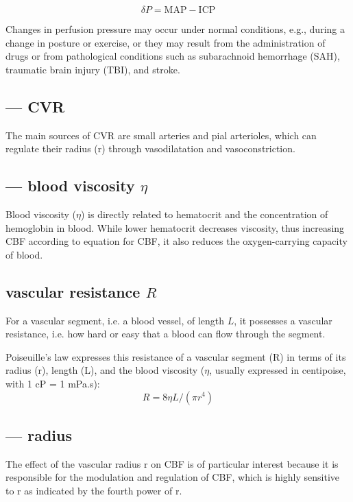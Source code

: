 \begin{equation}
\delta P = \text{MAP} - \text{ICP}
\end{equation}

Changes in perfusion pressure may occur under normal conditions, e.g., during a
change in posture or exercise, or they may result from the administration of
drugs or from pathological conditions such as subarachnoid hemorrhage (SAH),
traumatic brain injury (TBI), and stroke.  

\subsection{--- CVR}

The main sources of CVR are small arteries and pial arterioles, which can
regulate their radius (r) through vasodilatation and vasoconstriction.


\subsection{--- blood viscosity $\eta$}

Blood viscosity ($\eta$) is directly related to hematocrit and the concentration
of hemoglobin in blood. While lower hematocrit decreases viscosity, thus
increasing CBF according to equation for CBF, it also reduces the
oxygen-carrying capacity of blood.

\subsection{vascular resistance $R$}
\label{sec:vascular-resistance}

For a vascular segment, i.e. a blood vessel, of length $L$, it possesses a
vascular resistance, i.e. how hard or easy that a blood can flow through the
segment.

Poiseuille's law expresses this resistance of a vascular segment (R) in terms of
its radius (r), length (L), and the blood viscosity ($\eta$, usually expressed
in centipoise, with 1 cP = 1 mPa.s):
\begin{equation}
R = 8 \eta L/( \pi r^4)
\end{equation}

\subsection{--- radius}

The effect of the vascular radius r on CBF is of particular interest because it
is responsible for the modulation and regulation of CBF, which is highly
sensitive to r as indicated by the fourth power of r.

